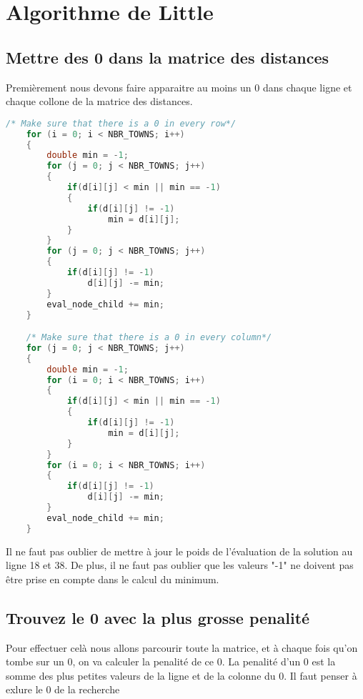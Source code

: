 \documentclass[11pt]{article}
\begin{document}
\section{Algorithme de Little}

\subsection{Mettre des 0 dans la matrice des distances}

Premièrement nous devons faire apparaitre au moins un 0 dans chaque ligne et chaque collone de la matrice des distances.

\begin{lstlisting}[language=C]
    /* Make sure that there is a 0 in every row*/
    for (i = 0; i < NBR_TOWNS; i++)
    {
        double min = -1;
        for (j = 0; j < NBR_TOWNS; j++)
        {
            if(d[i][j] < min || min == -1)
            {
                if(d[i][j] != -1)
                    min = d[i][j];
            }
        }
        for (j = 0; j < NBR_TOWNS; j++)
        {
            if(d[i][j] != -1)
                d[i][j] -= min;
        }
        eval_node_child += min;
    }

    /* Make sure that there is a 0 in every column*/
    for (j = 0; j < NBR_TOWNS; j++)
    {
        double min = -1;
        for (i = 0; i < NBR_TOWNS; i++)
        {
            if(d[i][j] < min || min == -1)
            {
                if(d[i][j] != -1)
                    min = d[i][j];
            }
        }
        for (i = 0; i < NBR_TOWNS; i++)
        {
            if(d[i][j] != -1)
                d[i][j] -= min;
        }
        eval_node_child += min;
    }
\end{lstlisting}

Il ne faut pas oublier de mettre à jour le poids de l'évaluation de la solution au ligne 18 et 38. De plus, il ne faut pas oublier que les valeurs "-1" ne doivent pas être prise en compte dans le calcul du minimum.

\subsection{Trouvez le 0 avec la plus grosse penalité}

Pour effectuer celà nous allons parcourir toute la matrice, et à chaque fois qu'on tombe sur un 0, on va calculer la penalité de ce 0. La penalité d'un 0 est la somme des plus petites valeurs de la ligne et de la colonne du 0. Il faut penser à exlure le 0 de la recherche
\end{document}
